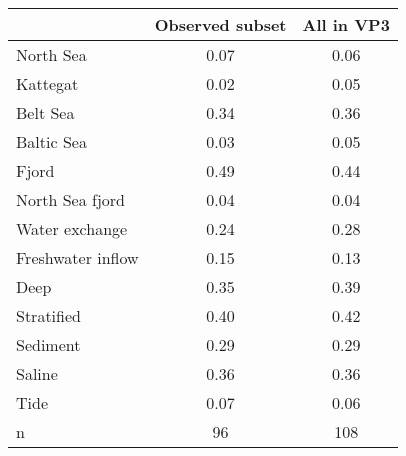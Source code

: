 \begin{tabular}{lcc}
\toprule
 & Observed subset & All in VP3 \\
\midrule
North Sea & 0.07 & 0.06 \\
Kattegat & 0.02 & 0.05 \\
Belt Sea & 0.34 & 0.36 \\
Baltic Sea & 0.03 & 0.05 \\
Fjord & 0.49 & 0.44 \\
North Sea fjord & 0.04 & 0.04 \\
Water exchange & 0.24 & 0.28 \\
Freshwater inflow & 0.15 & 0.13 \\
Deep & 0.35 & 0.39 \\
Stratified & 0.40 & 0.42 \\
Sediment & 0.29 & 0.29 \\
Saline & 0.36 & 0.36 \\
Tide & 0.07 & 0.06 \\
n & 96 & 108 \\
\bottomrule
\end{tabular}
